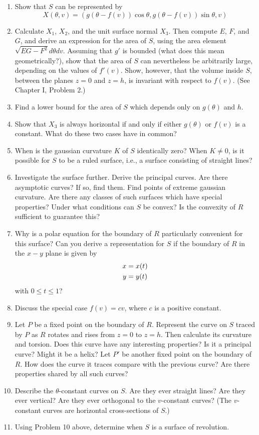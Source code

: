 \documentclass{book}
\begin{document}
\begin{enumerate}[1.]
  \item Show that $S$ can be represented by
    \begin{equation} 
      X(\theta,v) = (g (\theta - f(v)) \cos \theta, g (\theta - f(v)) \sin \theta, v)
    \end{equation}
  \item Calculate $X_{1}$, $X_{2}$, and the unit surface normal $X_{3}$. Then compute $E$, $F$, and $G$, and derive an expression for the area of $S$, using the area element $\sqrt{EG - F^{2}} d \theta dv$. Assuming that $g'$ is bounded (what does this mean geometrically?), show that the area of $S$ can nevertheless be arbitrarily large, depending on the values of $f'(v)$. Show, however, that the volume inside $S$, between the planes $z = 0$ and $z = h$, is invariant with respect to $f(v)$. (See Chapter I, Problem 2.)
  \item Find a lower bound for the area of $S$ which depends only on $g(\theta)$ and $h$.
  \item Show that $X_{3}$ is always horizontal if and only if either $g(\theta)$ or $f(v)$ is a constant. What do these two cases have in common?
  \item When is the gaussian curvature $K$ of $S$ identically zero? When $K \neq 0$, is it possible for $S$ to be a ruled surface, i.e., a surface consisting of straight lines?
  \item Investigate the surface further. Derive the principal curves. Are there asymptotic curves? If so, find them. Find points of extreme gaussian curvature. Are there any classes of such surfaces which have special properties? Under what conditions can $S$ be convex? Is the convexity of $R$ sufficient to guarantee this?
  \item Why is a polar equation for the boundary of $R$ particularly convenient for this surface? Can you derive a representation for $S$ if the boundary of $R$ in the $x-y$ plane is given by
    \begin{align}
      x & = x(t) \\
      y & = y(t) \notag
    \end{align}
     with $0 \leq t \leq 1$?
  \item Discuss the special case $f(v) = cv$, where $c$ is a positive constant.
  \item Let $P$ be a fixed point on the boundary of $R$. Represent the curve on $S$ traced by $P$ as $R$ rotates and rises from $z = 0$ to $z = h$. Then calculate its curvature and torsion. Does this curve have any interesting properties? Is it a principal curve? Might it be a helix? Let $P'$ be another fixed point on the boundary of $R$. How does the curve it traces compare with the previous curve? Are there properties shared by all such curves?
  \item Describe the $\theta$-constant curves on $S$. Are they ever straight lines? Are they ever vertical? Are they ever orthogonal to the $v$-constant curves? (The $v$-constant curves are horizontal cross-sections of $S$.)
  \item Using Problem 10 above, determine when $S$ is a surface of revolution.
\end{enumerate}
\end{document}

